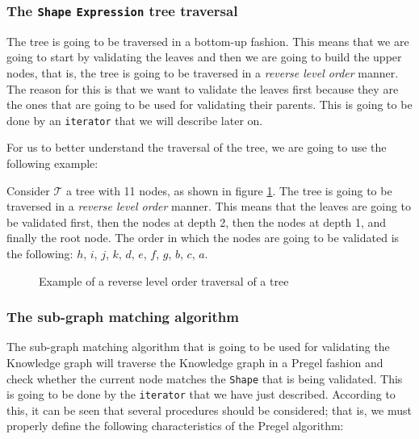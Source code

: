 \subsubsection{The \texttt{Shape} \texttt{Expression} tree traversal}

The tree is going to be traversed in a bottom-up fashion. This means that we are going to start by validating the leaves and then we are going to build the upper nodes, that is, the tree is going to be traversed in a \textit{reverse level order} manner. The reason for this is that we want to validate the leaves first because they are the ones that are going to be used for validating their parents. This is going to be done by an \texttt{iterator} that we will describe later on.

For us to better understand the traversal of the tree, we are going to use the following example:

\begin{example}
    Consider $\mathcal{T}$ a tree with 11 nodes, as shown in figure \ref{fig:tree_traversal}. The tree is going to be traversed in a \textit{reverse level order} manner. This means that the leaves are going to be validated first, then the nodes at depth 2, then the nodes at depth 1, and finally the root node. The order in which the nodes are going to be validated is the following: $h$, $i$, $j$, $k$, $d$, $e$, $f$, $g$, $b$, $c$, $a$.
    \begin{figure}[ht]
        \centering
        
        \caption{Example of a reverse level order traversal of a tree}
        \label{fig:tree_traversal}
    \end{figure}
\end{example}

\subsubsection{The sub-graph matching algorithm}

The sub-graph matching algorithm that is going to be used for validating the Knowledge graph will traverse the Knowledge graph in a Pregel fashion and check whether the current node matches the \texttt{Shape} that is being validated. This is going to be done by the \texttt{iterator} that we have just described. According to this, it can be seen that several procedures should be considered; that is, we must properly define the following characteristics of the Pregel algorithm:

